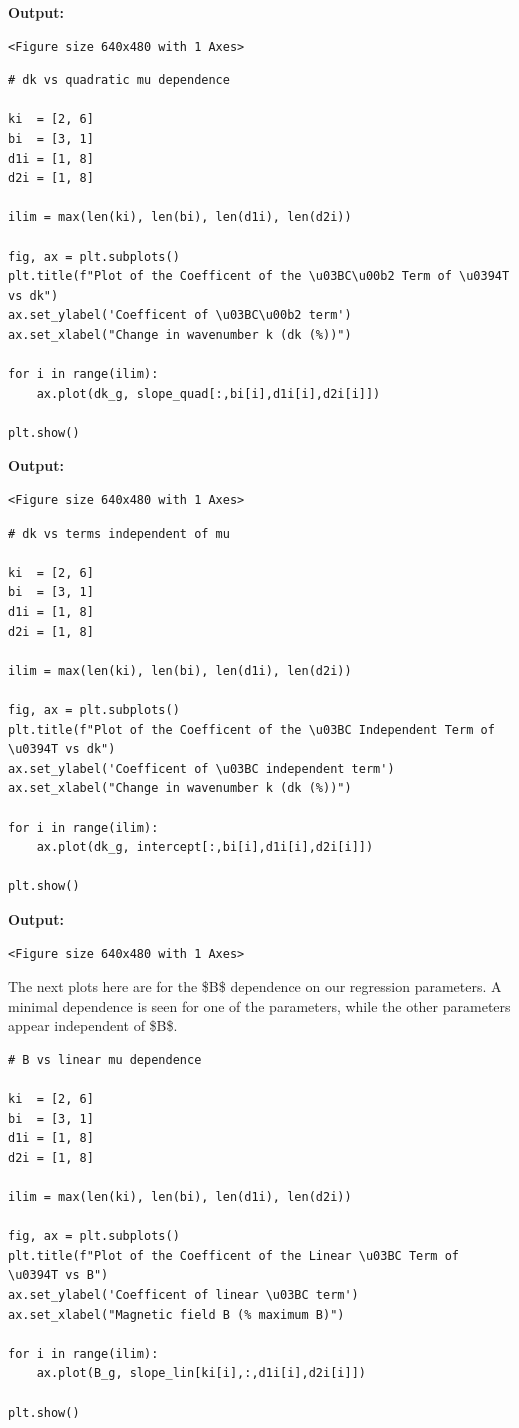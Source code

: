 \documentclass{article}
\begin{document}
\textbf{Output:}\begin{verbatim}
<Figure size 640x480 with 1 Axes>
\end{verbatim}

\begin{lstlisting}
# dk vs quadratic mu dependence

ki  = [2, 6]
bi  = [3, 1]
d1i = [1, 8]
d2i = [1, 8]

ilim = max(len(ki), len(bi), len(d1i), len(d2i))

fig, ax = plt.subplots()
plt.title(f"Plot of the Coefficent of the \u03BC\u00b2 Term of \u0394T vs dk")
ax.set_ylabel('Coefficent of \u03BC\u00b2 term')
ax.set_xlabel("Change in wavenumber k (dk (%))")

for i in range(ilim):
    ax.plot(dk_g, slope_quad[:,bi[i],d1i[i],d2i[i]])

plt.show()\end{lstlisting}

\textbf{Output:}\begin{verbatim}
<Figure size 640x480 with 1 Axes>
\end{verbatim}

\begin{lstlisting}
# dk vs terms independent of mu

ki  = [2, 6]
bi  = [3, 1]
d1i = [1, 8]
d2i = [1, 8]

ilim = max(len(ki), len(bi), len(d1i), len(d2i))

fig, ax = plt.subplots()
plt.title(f"Plot of the Coefficent of the \u03BC Independent Term of \u0394T vs dk")
ax.set_ylabel('Coefficent of \u03BC independent term')
ax.set_xlabel("Change in wavenumber k (dk (%))")

for i in range(ilim):
    ax.plot(dk_g, intercept[:,bi[i],d1i[i],d2i[i]])

plt.show()\end{lstlisting}

\textbf{Output:}\begin{verbatim}
<Figure size 640x480 with 1 Axes>
\end{verbatim}

The next plots here are for the \$B\$ dependence on our regression parameters. A minimal dependence is seen for one of the parameters, while the other parameters appear independent of \$B\$.

\begin{lstlisting}
# B vs linear mu dependence

ki  = [2, 6]
bi  = [3, 1]
d1i = [1, 8]
d2i = [1, 8]

ilim = max(len(ki), len(bi), len(d1i), len(d2i))

fig, ax = plt.subplots()
plt.title(f"Plot of the Coefficent of the Linear \u03BC Term of \u0394T vs B")
ax.set_ylabel('Coefficent of linear \u03BC term')
ax.set_xlabel("Magnetic field B (% maximum B)")

for i in range(ilim):
    ax.plot(B_g, slope_lin[ki[i],:,d1i[i],d2i[i]])

plt.show()\end{lstlisting}
\end{document}
